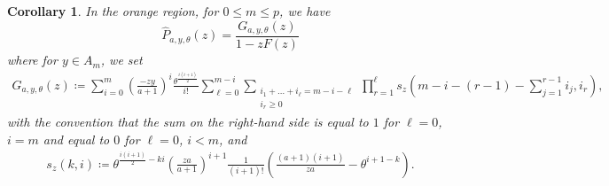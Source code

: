\documentclass[12pt]{article}
\newcommand{\1}{\mathds{1}}
\theoremstyle{definition}
\theoremstyle{plain}
\newtheorem{Corollary}[definition]{Corollary}
\theoremstyle{remark}
\newtheorem{Remark}{Remark}
\begin{document}
\begin{Corollary}\label{orange_GF_in_G_und_F}
    In the orange region, for $0\le m\le p$, we have  $$\hat{P}_{a,y,\theta}(z)=\frac{G_{a,y,\theta}(z)}{1-zF(z)}$$ where for $y\in A_m$, we set
    \begin{align*}
        G_{a,y,\theta}(z)\coloneqq\sum_{i=0}^m \left(\frac{-zy}{a+1}\right)^i\frac{\theta^\frac{i(i+1)}{2}}{i!}\sum_{{\ell}=0}^{m-i}\sum_{\substack{i_1+\dots +i_{\ell}= m -i-{\ell}\\i_r\ge 0}}\prod_{r=1}^{\ell}s_z(m-i-(r-1)-\sum_{j=1}^{r-1}i_j,i_r),
    \end{align*}
    with the convention that the sum on the right-hand side is equal to $1$ for ${\ell}=0$, $i=m$ and equal to $0$ for ${\ell}=0$, $i<m$, and
    \begin{align*}
        s_z(k,i)\coloneqq \theta^{\frac{i(i+1)}{2}-ki}\left(\frac{za}{a+1}\right)^{i+1}\frac{1}{(i+1)!}\left(\frac{(a+1)(i+1)}{za}-\theta^{i+1-k}\right).
    \end{align*}
    \end{Corollary}
\end{document}
